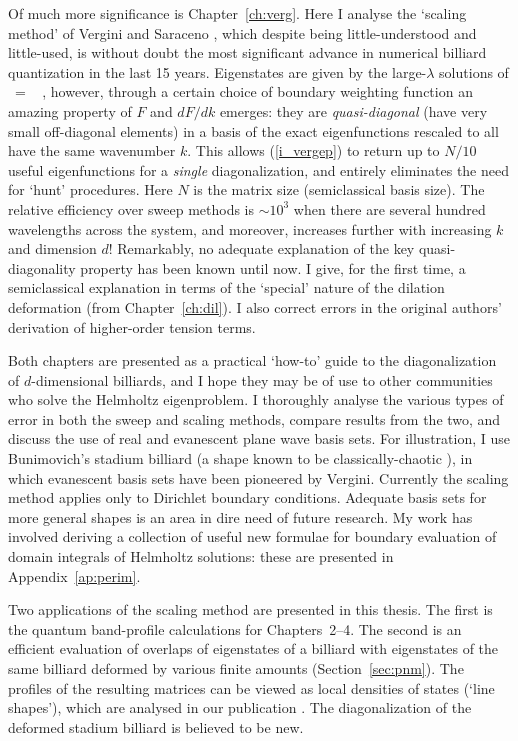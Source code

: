 Of much more significance is Chapter~\ref{ch:verg}.
Here I analyse the
`scaling method' of Vergini and Saraceno
\cite{v+s,verginithesis},
which despite being little-understood and little-used, is without doubt the
most significant advance in numerical billiard quantization in the last 15 years.
Eigenstates are given by the large-$\lambda$ solutions of
\be
\label{i_vergep}
	  \ = \  ,
\ee
however, through a certain choice of boundary weighting function
an amazing property of $F$ and $dF/dk$ emerges:
they are {\em quasi-diagonal} (have very small off-diagonal elements)
in a basis of
the exact eigenfunctions rescaled to all have the same wavenumber $k$.
This allows (\ref{i_vergep}) to return up to $N/10$ useful eigenfunctions
for a {\em single} diagonalization,
and entirely eliminates the need for `hunt' procedures.
Here $N$ is the matrix size (semiclassical basis size).
The relative efficiency over sweep methods is $\sim 10^3$ when there are
several hundred wavelengths across the system, and moreover,
increases further with increasing $k$ and dimension $d$!
Remarkably, no adequate explanation of the key quasi-diagonality property
has been known until now.
I give, for the first time, a semiclassical
explanation in terms of the `special' nature of
the dilation deformation (from Chapter~\ref{ch:dil}).
I also correct errors in the original authors' derivation
\cite{v+s,verginithesis} of higher-order tension terms.

Both chapters are presented as a practical `how-to' guide to the diagonalization
of $d$-dimensional billiards, and I hope they may be of use
to other communities who solve the Helmholtz eigenproblem.
I thoroughly analyse the various types of error in both the sweep
and scaling methods, compare results from the two, and discuss
the use of real and evanescent plane
wave basis sets.
For illustration, I use Bunimovich's stadium billiard (a shape known to
be classically-chaotic \cite{bunimovich}), in which
evanescent basis sets have been pioneered by Vergini\cite{verginithesis}.
Currently the scaling method applies only to Dirichlet boundary conditions.
Adequate basis
sets for more general shapes is an area in dire need of future research.
My work has involved deriving a collection of useful new formulae for
boundary evaluation of domain integrals of Helmholtz solutions:
these are presented in Appendix~\ref{ap:perim}.

Two applications of the scaling method are presented in this thesis.
The first is the quantum band-profile calculations for Chapters~2--4.
The second is an efficient
evaluation of overlaps of eigenstates of a billiard with
eigenstates of the same billiard deformed by various finite amounts
(Section~\ref{sec:pnm}).
The profiles of the resulting matrices can be viewed as local densities
of states (`line shapes'), which are analysed in our publication \cite{pnm}.
The diagonalization of the deformed stadium billiard is believed to be new.


